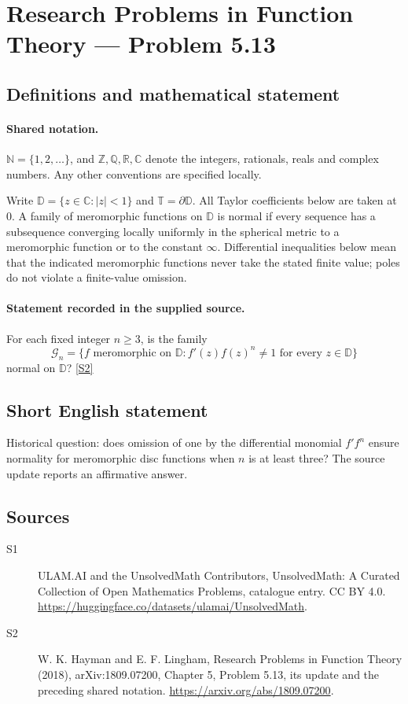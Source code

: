 \documentclass[11pt]{article}
\newcommand{\sref}[2]{\hyperlink{source:#1:#2}{[S#2]}}
\begin{document}
\section{Research Problems in Function Theory — Problem 5.13}\label{statement}

\subsection{Definitions and mathematical statement}

\paragraph{Shared notation.}$\mathbb N=\{1,2,\ldots\}$, and $\mathbb Z,\mathbb Q,\mathbb R,\mathbb C$ denote the integers, rationals, reals and complex numbers. Any other conventions are specified locally.


Write $\mathbb D=\{z\in\mathbb C:|z|<1\}$ and $\mathbb T=\partial\mathbb D$. All Taylor coefficients below are taken at $0$. A family of meromorphic functions on $\mathbb D$ is normal if every sequence has a subsequence converging locally uniformly in the spherical metric to a meromorphic function or to the constant $\infty$. Differential inequalities below mean that the indicated meromorphic functions never take the stated finite value; poles do not violate a finite-value omission.
\paragraph{Statement recorded in the supplied source.}
For each fixed integer $n\ge3$, is the family
\[\mathcal G_n=\{f\text{ meromorphic on }\mathbb D:f'(z)f(z)^n\ne1\text{ for every }z\in\mathbb D\}\]
normal on $\mathbb D$? \sref{statement}{2}
\subsection{Short English statement}
Historical question: does omission of one by the differential monomial $f'f^n$ ensure normality for meromorphic disc functions when $n$ is at least three? The source update reports an affirmative answer.
\subsection{Sources}
\begin{description}
\item[\hypertarget{source:statement:1}{S1}] ULAM.AI and the UnsolvedMath Contributors, UnsolvedMath: A Curated Collection of Open Mathematics Problems, catalogue entry. CC BY 4.0. \url{https://huggingface.co/datasets/ulamai/UnsolvedMath}.
\item[\hypertarget{source:statement:2}{S2}] W. K. Hayman and E. F. Lingham, Research Problems in Function Theory (2018), arXiv:1809.07200, Chapter 5, Problem 5.13, its update and the preceding shared notation. \url{https://arxiv.org/abs/1809.07200}.
\end{description}
\label{end:statement}
\end{document}
